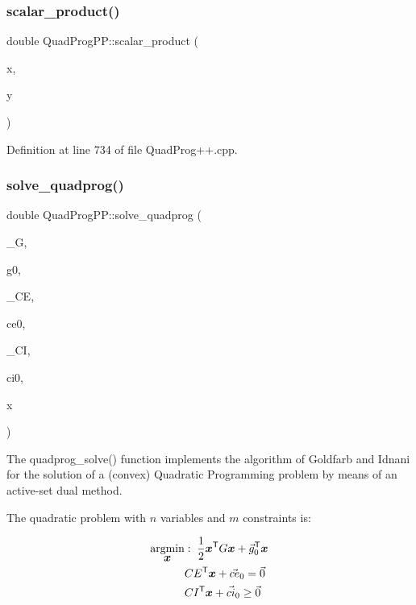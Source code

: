 \subsubsection{\texorpdfstring{scalar\+\_\+product()}{scalar\_product()}}
{\footnotesize\ttfamily double Quad\+Prog\+P\+P\+::scalar\+\_\+product (\begin{DoxyParamCaption}\item[{const Eigen\+::\+Vector\+Xd \&}]{x,  }\item[{const Eigen\+::\+Vector\+Xd \&}]{y }\end{DoxyParamCaption})\hspace{0.3cm}{\ttfamily [inline]}}



Definition at line 734 of file Quad\+Prog++.\+cpp.

\hypertarget{namespaceQuadProgPP_a3660acf00652641e6b81b5106a44efbd}{}\label{namespaceQuadProgPP_a3660acf00652641e6b81b5106a44efbd} 
\subsubsection{\texorpdfstring{solve\+\_\+quadprog()}{solve\_quadprog()}}
{\footnotesize\ttfamily double Quad\+Prog\+P\+P\+::solve\+\_\+quadprog (\begin{DoxyParamCaption}\item[{const Eigen\+::\+Matrix\+Xd \&}]{\+\_\+G,  }\item[{const Eigen\+::\+Vector\+Xd \&}]{g0,  }\item[{const Eigen\+::\+Matrix\+Xd \&}]{\+\_\+\+CE,  }\item[{const Eigen\+::\+Vector\+Xd \&}]{ce0,  }\item[{const Eigen\+::\+Matrix\+Xd \&}]{\+\_\+\+CI,  }\item[{const Eigen\+::\+Vector\+Xd \&}]{ci0,  }\item[{Eigen\+::\+Vector\+Xd \&}]{x }\end{DoxyParamCaption})}

The quadprog\+\_\+solve() function implements the algorithm of Goldfarb and Idnani for the solution of a (convex) Quadratic Programming problem by means of an active-\/set dual method.

The quadratic problem with $n$ variables and $m$ constraints is\+:

\begin{align*} \underset{\mbox{\boldmath${x}$}}{\operatorname{argmin}} &: \; \frac{1}{2} \mbox{\boldmath${x}$}^{\mathsf{T}} G \mbox{\boldmath${x}$} + \vec{g}_0^{\mathsf{T}} \mbox{\boldmath${x}$} \\ & CE^{\mathsf{T}} \mbox{\boldmath${x}$} + \vec{ce}_0 = \vec{0} \\ & CI^{\mathsf{T}} \mbox{\boldmath${x}$} + \vec{ci}_0 \geq \vec{0} \end{align*}


